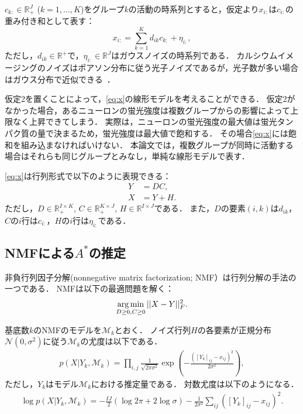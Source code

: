 $c_{k:} \in \mathbb{R}^J_+$ ($k=1,\dots,K$)をグループ$k$の活動の時系列とすると，仮定より$x_{i:}$は$c_{i:}$の重み付き和として表す：
\begin{equation}
	x_{i:} = \sum_{k=1}^K d_{ik} c_{k:} + \eta_{i:},
  \label{eq:x}
\end{equation}
ただし，$d_{ik} \in \mathbb{R}^+$で，$\eta_{i:} \in \mathbb{R}^J$はガウスノイズの時系列である．
カルシウムイメージングのノイズはポアソン分布に従う光子ノイズであるが，光子数が多い場合はガウス分布で近似できる~\cite{Sjulson2007}．

仮定2を置くことによって，\eqref{eq:x}の線形モデルを考えることができる．
仮定2がなかった場合，あるニューロンの蛍光強度は複数グループからの影響によって上限なく上昇できてしまう．
実際は，ニューロンの蛍光強度の最大値は蛍光タンパク質の量で決まるため，蛍光強度は最大値で飽和する．
その場合\eqref{eq:x}には飽和を組み込まなければいけない．
本論文では，複数グループが同時に活動する場合はそれらも同じグループとみなし，単純な線形モデルで表す．

\eqref{eq:x}は行列形式で以下のように表現できる：
\begin{align}
  Y &= DC, \\
  X &= Y + H. \label{eq:model_matrix}
\end{align}
ただし，$D \in \mathbb{R}_+^{I \times K}$, $C \in \mathbb{R}_+^{K \times J}$, $H \in \mathbb{R}^{I \times J}$である．
また，$D$の要素$(i,k)$は$d_{ik}$，$C$の$i$行は$c_{i:}$，$H$の$i$行は$\eta_{i:}$である．

\subsection{NMFによる$A^*$の推定}
非負行列因子分解(nonnegative matrix factorization; NMF）\cite{Lee1999}は行列分解の手法の一つである．
NMFは以下の最適問題を解く：
\begin{equation}
	\operatorname*{arg\,min}_{D \geq 0, C \geq 0} ||X - Y||_F^2.
\end{equation}

基底数$k$のNMFのモデルを$\mathcal{M}_k$とおく．
ノイズ行列$H$の各要素が正規分布$\mathcal{N} (0, \sigma^2)$に従う$\mathcal{M}_k$の尤度は以下である．
\begin{align}
	p(X | Y_k, \mathcal{M}_k) = \prod_{i,j} \frac{1}{\sqrt{2 \pi \sigma^2}} \exp(-\frac{([Y_k]_{ij} - x_{ij})^2}{2 \sigma^2}),
\end{align}
ただし，$Y_k$はモデル$\mathcal{M}_k$における推定量である．
対数尤度は以下のようになる．
\begin{align}
	\log p(X | Y_k, \mathcal{M}_k) = - \frac{IJ}{2} (\log 2\pi + 2 \log \sigma) - \frac{1}{2 \sigma^2} \sum_{ij}([Y_k]_{ij} - x_{ij})^2.
\end{align}

